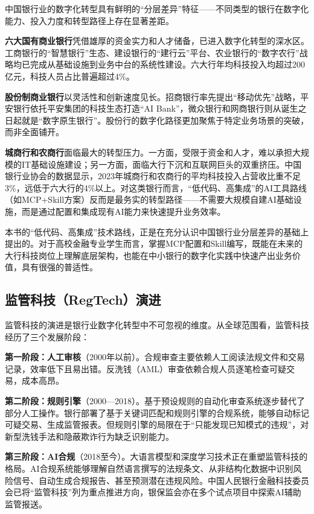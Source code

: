 中国银行业的数字化转型具有鲜明的``分层差异''特征——不同类型的银行在数字化能力、投入力度和转型路径上存在显著差距。

\textbf{六大国有商业银行}凭借雄厚的资金实力和人才储备，已进入数字化转型的深水区。工商银行的``智慧银行''生态、建设银行的``建行云''平台、农业银行的``数字农行''战略均已完成从基础设施到业务中台的系统性建设。六大行年均科技投入均超过200亿元，科技人员占比普遍超过4\%。

\textbf{股份制商业银行}以灵活性和创新速度见长。招商银行率先提出``移动优先''战略，平安银行依托平安集团的科技生态打造``AI Bank''，微众银行和网商银行则从诞生之日起就是``数字原生银行''。股份行的数字化路径更加聚焦于特定业务场景的突破，而非全面铺开。

\textbf{城商行和农商行}面临最大的转型压力。一方面，受限于资金和人才，难以承担大规模的IT基础设施建设；另一方面，面临大行下沉和互联网巨头的双重挤压。中国银行业协会的数据显示，2023年城商行和农商行的平均科技投入占营收比重不足3\%，远低于六大行的4\%以上\parencite{cba2024report}。对这类银行而言，``低代码、高集成''的AI工具路线（如MCP+Skill方案）反而是最务实的转型路径——不需要大规模自建AI基础设施，而是通过配置和集成现有AI能力来快速提升业务效率。

\begin{notebox}[本书视角]
本书的``低代码、高集成''技术路线，正是在充分认识中国银行业分层差异的基础上提出的。对于高校金融专业学生而言，掌握MCP配置和Skill编写，既能在未来的大行科技岗位上理解底层架构，也能在中小银行的数字化实践中快速产出业务价值，具有很强的普适性。
\end{notebox}

\subsection{监管科技（RegTech）演进}

监管科技的演进是银行业数字化转型中不可忽视的维度。从全球范围看，监管科技经历了三个发展阶段：

\textbf{第一阶段：人工审核}（2000年以前）。合规审查主要依赖人工阅读法规文件和交易记录，效率低下且易出错。反洗钱（AML）审查依赖合规人员逐笔检查可疑交易，成本高昂。

\textbf{第二阶段：规则引擎}（2000—2018）。基于预设规则的自动化审查系统逐步替代了部分人工操作。银行部署了基于关键词匹配和规则引擎的合规系统，能够自动标记可疑交易、生成监管报表。但规则引擎的局限在于``只能发现已知模式的违规''，对新型洗钱手法和隐蔽欺诈行为缺乏识别能力。

\textbf{第三阶段：AI合规}（2018至今）。大语言模型和深度学习技术正在重塑监管科技的格局。AI合规系统能够理解自然语言撰写的法规条文、从非结构化数据中识别风险信号、自动生成合规报告、甚至预测潜在违规风险。中国人民银行金融科技委员会已将``监管科技''列为重点推进方向，银保监会亦在多个试点项目中探索AI辅助监管报送。

